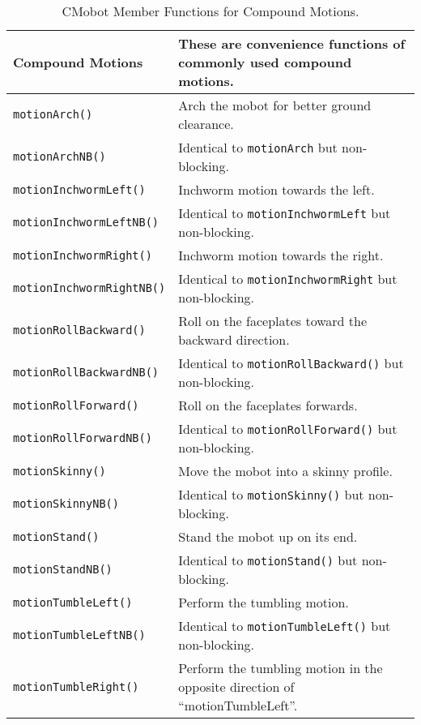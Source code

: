 \begin{table}[!h]
\begin{center}
\caption{CMobot Member Functions for Compound Motions.}
\begin{tabular}{p{38 mm}p{107 mm}}
Compound Motions & These are convenience functions of commonly used compound motions. \\
\hline
\texttt{motionArch()} \dotfill & Arch the mobot for better ground clearance. \\
\texttt{motionArchNB()} \dotfill & Identical to \texttt{motionArch} but non-blocking. \\
\texttt{motionInchwormLeft()} \dotfill & Inchworm motion towards the left. \\
\texttt{motionInchwormLeftNB()} \dotfill & Identical to \texttt{motionInchwormLeft} but non-blocking. \\
\texttt{motionInchwormRight()} \dotfill & Inchworm motion towards the right. \\
\texttt{motionInchwormRightNB()} \dotfill & Identical to \texttt{motionInchwormRight} but non-blocking. \\
\texttt{motionRollBackward()} \dotfill & Roll on the faceplates toward the backward direction. \\
\texttt{motionRollBackwardNB()} \dotfill & Identical to \texttt{motionRollBackward()} but non-blocking. \\
\texttt{motionRollForward()} \dotfill & Roll on the faceplates forwards. \\
\texttt{motionRollForwardNB()} \dotfill & Identical to \texttt{motionRollForward()} but non-blocking. \\
\texttt{motionSkinny()} \dotfill & Move the mobot into a skinny profile. \\
\texttt{motionSkinnyNB()} \dotfill & Identical to \texttt{motionSkinny()} but non-blocking. \\
\texttt{motionStand()} \dotfill & Stand the mobot up on its end. \\
\texttt{motionStandNB()} \dotfill & Identical to \texttt{motionStand()} but non-blocking. \\
\texttt{motionTumbleLeft()} \dotfill & Perform the tumbling motion. \\
\texttt{motionTumbleLeftNB()} \dotfill & Identical to \texttt{motionTumbleLeft()} but non-blocking. \\
\texttt{motionTumbleRight()} \dotfill & Perform the tumbling motion in the opposite direction of ``motionTumbleLeft''. \\

\end{tabular}
\end{center}
\end{table}
